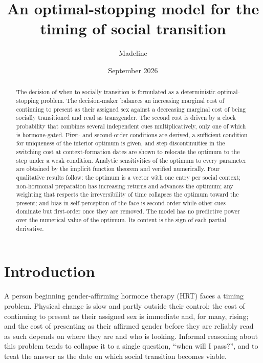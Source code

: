 \documentclass[11pt,a4paper]{article}
\title{An optimal-stopping model for the timing of social transition}
\author{Madeline}
\date{September 2026}
\theoremstyle{remark}
\begin{document}
\maketitle

\begin{abstract}
The decision of when to socially transition is formulated as a deterministic optimal-stopping problem. The decision-maker balances an increasing marginal cost of continuing to present as their assigned sex against a decreasing marginal cost of being socially transitioned and read as transgender. The second cost is driven by a clock probability that combines several independent cues multiplicatively, only one of which is hormone-gated. First- and second-order conditions are derived, a sufficient condition for uniqueness of the interior optimum is given, and step discontinuities in the switching cost at context-formation dates are shown to relocate the optimum to the step under a weak condition. Analytic sensitivities of the optimum to every parameter are obtained by the implicit function theorem and verified numerically. Four qualitative results follow: the optimum is a vector with one entry per social context; non-hormonal preparation has increasing returns and advances the optimum; any weighting that respects the irreversibility of time collapses the optimum toward the present; and bias in self-perception of the face is second-order while other cues dominate but first-order once they are removed. The model has no predictive power over the numerical value of the optimum. Its content is the sign of each partial derivative.
\end{abstract}

\section{Introduction}

A person beginning gender-affirming hormone therapy (HRT) faces a timing problem. Physical change is slow and partly outside their control; the cost of continuing to present as their assigned sex is immediate and, for many, rising; and the cost of presenting as their affirmed gender before they are reliably read as such depends on where they are and who is looking. Informal reasoning about this problem tends to collapse it to a single question, ``when will I pass?'', and to treat the answer as the date on which social transition becomes viable.
\end{document}
